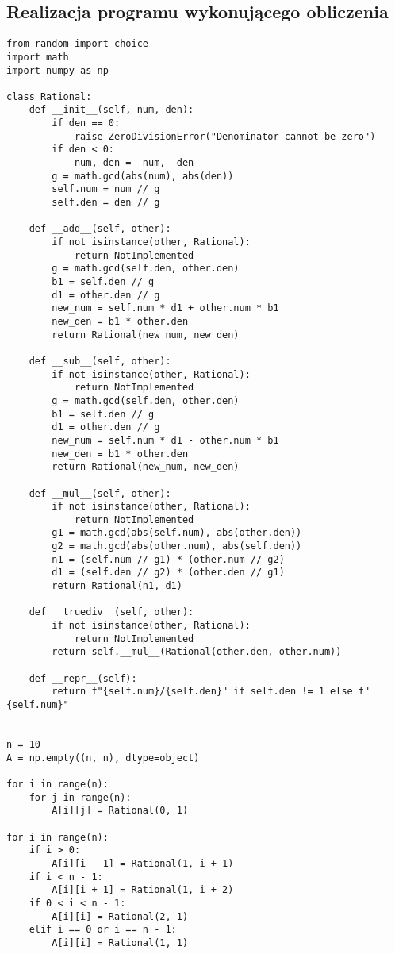 \documentclass[a4paper,12pt]{article}
\begin{document}
\subsection*{Realizacja programu wykonującego obliczenia}

\begin{lstlisting}
from random import choice
import math
import numpy as np

class Rational:
    def __init__(self, num, den):
        if den == 0:
            raise ZeroDivisionError("Denominator cannot be zero")
        if den < 0:
            num, den = -num, -den
        g = math.gcd(abs(num), abs(den))
        self.num = num // g
        self.den = den // g

    def __add__(self, other):
        if not isinstance(other, Rational):
            return NotImplemented
        g = math.gcd(self.den, other.den)
        b1 = self.den // g
        d1 = other.den // g
        new_num = self.num * d1 + other.num * b1
        new_den = b1 * other.den
        return Rational(new_num, new_den)

    def __sub__(self, other):
        if not isinstance(other, Rational):
            return NotImplemented
        g = math.gcd(self.den, other.den)
        b1 = self.den // g
        d1 = other.den // g
        new_num = self.num * d1 - other.num * b1
        new_den = b1 * other.den
        return Rational(new_num, new_den)

    def __mul__(self, other):
        if not isinstance(other, Rational):
            return NotImplemented
        g1 = math.gcd(abs(self.num), abs(other.den))
        g2 = math.gcd(abs(other.num), abs(self.den))
        n1 = (self.num // g1) * (other.num // g2)
        d1 = (self.den // g2) * (other.den // g1)
        return Rational(n1, d1)

    def __truediv__(self, other):
        if not isinstance(other, Rational):
            return NotImplemented
        return self.__mul__(Rational(other.den, other.num))

    def __repr__(self):
        return f"{self.num}/{self.den}" if self.den != 1 else f"{self.num}"


n = 10
A = np.empty((n, n), dtype=object)

for i in range(n):
    for j in range(n):
        A[i][j] = Rational(0, 1)

for i in range(n):
    if i > 0:
        A[i][i - 1] = Rational(1, i + 1)
    if i < n - 1:
        A[i][i + 1] = Rational(1, i + 2)
    if 0 < i < n - 1:
        A[i][i] = Rational(2, 1)
    elif i == 0 or i == n - 1:
        A[i][i] = Rational(1, 1)



\end{lstlisting}
\end{document}
